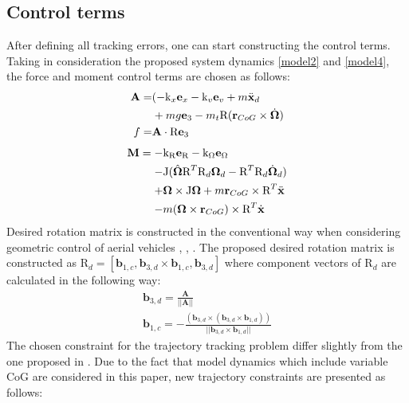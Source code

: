 \subsection{Control terms}
After defining all tracking errors, one can start constructing the control terms. Taking in consideration the proposed system dynamics \eqref{model2} and \eqref{model4}, the force and moment control terms are chosen as follows:
\begin{align}
	\begin{split}
		\textbf{A} =& (- \text{k}_x \textbf{e}_x - \text{k}_v \textbf{e}_v + m\ddot{\textbf{x}}_d \\
		& + mg\textbf{e}_3 - m_t \text{R}(\textbf{r}_{CoG} \times \dot{\boldsymbol{\Omega}}) \\
		f =& \textbf{A} \cdot \text{R}\textbf{e}_3 \label{force_control}
	\end{split}
\end{align}
\begin{align}
	\begin{split}
		\textbf{M} = -& \text{k}_\text{R} \textbf{e}_\text{R} - \text{k}_\Omega \textbf{e}_\Omega \\
			- & \text{J}(\hat{\boldsymbol{\Omega}}\text{R}^T\text{R}_d\boldsymbol{\Omega}_d - \text{R}^T\text{R}_d\dot{\boldsymbol{\Omega}}_d) \\
			+ & \boldsymbol{\Omega} \times \text{J}\boldsymbol{\Omega} + m\textbf{r}_{CoG} \times \text{R}^T \ddot{\textbf{x}}  \label{moment_control} \\
			- & m (\boldsymbol{\Omega} \times \textbf{r}_{CoG}) \times \text{R}^T \dot{\textbf{x}}
	\end{split}
\end{align}
\indent Desired rotation matrix is constructed in the conventional way when considering geometric control of aerial vehicles \cite{LeeClanak4}, \cite{LeeClanak3}, \cite{LeeClanak2}. The proposed desired rotation matrix is constructed as $\text{R}_d = [\textbf{b}_{1,c}, \textbf{b}_{3,d} \times \textbf{b}_{1,c}, \textbf{b}_{3,d}]$ where component vectors of $\text{R}_d$ are calculated in the following way:
\begin{gather}
	\textbf{b}_{3,d} = \frac{\textbf{A}}{|| \textbf{A} ||} \\
	\textbf{b}_{1,c} = -\frac{(\textbf{b}_{3,d} \times (\textbf{b}_{3,d} \times \textbf{b}_{1,d}))}{||\textbf{b}_{3,d} \times \textbf{b}_{1,d}||}
\end{gather}
The chosen constraint for the trajectory tracking problem differ slightly from the one proposed in \cite{LeeClanak4}. Due to the fact that model dynamics which include variable CoG are considered in this paper, new trajectory constraints are presented as follows:

